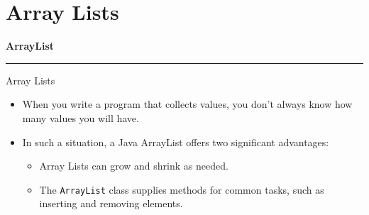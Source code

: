 \documentclass[aspectratio=43,10pt,t]{beamer}
\newcommand{\code}[1]{\texttt{#1}}
\begin{document}
\section{Array Lists}
\begin{frame}[plain]
  \vfill
  \begin{center}
    {\Large\bfseries ArrayList\par}
    \vskip1mm
    {\color{titlerule}\rule{0.6\paperwidth}{1.3pt}}
  \end{center}
  \vfill
\end{frame}

\begin{frame}{Array Lists}
  \begin{itemize}
    \item When you write a program that collects values, you don't always know how many values you will have.
    \item In such a situation, a Java ArrayList offers two significant advantages:
      \begin{itemize}
        \item Array Lists can grow and shrink as needed.
        \item The \code{ArrayList} class supplies methods for common tasks, such as inserting and removing elements.
      \end{itemize}
  \end{itemize}
\end{frame}
\end{document}
